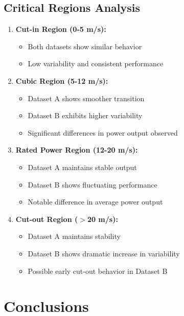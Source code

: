 \documentclass[a4paper,11pt]{article}
\begin{document}
\subsection{Critical Regions Analysis}

\begin{enumerate}
    \item \textbf{Cut-in Region (0-5 \si{m/s}):}
    \begin{itemize}
        \item Both datasets show similar behavior
        \item Low variability and consistent performance
    \end{itemize}

    \item \textbf{Cubic Region (5-12 \si{m/s}):}
    \begin{itemize}
        \item Dataset A shows smoother transition
        \item Dataset B exhibits higher variability
        \item Significant differences in power output observed
    \end{itemize}

    \item \textbf{Rated Power Region (12-20 \si{m/s}):}
    \begin{itemize}
        \item Dataset A maintains stable output
        \item Dataset B shows fluctuating performance
        \item Notable difference in average power output
    \end{itemize}

    \item \textbf{Cut-out Region ($>$20 \si{m/s}):}
    \begin{itemize}
        \item Dataset A maintains stability
        \item Dataset B shows dramatic increase in variability
        \item Possible early cut-out behavior in Dataset B
    \end{itemize}
\end{enumerate}

\section{Conclusions}
\end{document}
